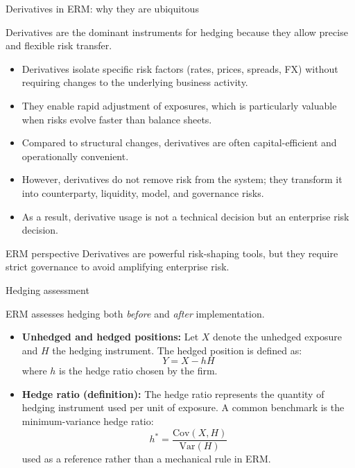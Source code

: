 \documentclass[aspectratio=169, 10pt]{beamer} %
\begin{document}
\begin{frame}{Derivatives in ERM: why they are ubiquitous}

Derivatives are the dominant instruments for hedging because they allow
precise and flexible risk transfer.

\medskip

\begin{itemize}
  \item[$\bullet$] Derivatives isolate specific risk factors (rates, prices,
  spreads, FX) without requiring changes to the underlying business activity.

  \item[$\bullet$] They enable rapid adjustment of exposures, which is
  particularly valuable when risks evolve faster than balance sheets.

  \item[$\bullet$] Compared to structural changes, derivatives are often
  capital-efficient and operationally convenient.
\end{itemize}

\begin{itemize}
  \item[$\bullet$] However, derivatives do not remove risk from the system;
  they transform it into counterparty, liquidity, model, and governance risks.

  \item[$\bullet$] As a result, derivative usage is not a technical decision
  but an enterprise risk decision.
\end{itemize}

\begin{block}{ERM perspective}
Derivatives are powerful risk-shaping tools, but they require strict governance
to avoid amplifying enterprise risk.
\end{block}

\end{frame}

\begin{frame}{Hedging assessment}

ERM assesses hedging both \emph{before} and \emph{after} implementation.

\medskip

\begin{itemize}
  \item[$\bullet$] \textbf{Unhedged and hedged positions:}
  Let $X$ denote the unhedged exposure and $H$ the hedging instrument.
  The hedged position is defined as:
  \[
  Y = X - hH
  \]
  where $h$ is the hedge ratio chosen by the firm.

  \item[$\bullet$] \textbf{Hedge ratio (definition):}
  The hedge ratio represents the quantity of hedging instrument used per unit
  of exposure. A common benchmark is the minimum-variance hedge ratio:
  \[
  h^* = \frac{\mathrm{Cov}(X,H)}{\mathrm{Var}(H)}
  \]
  used as a reference rather than a mechanical rule in ERM.
\end{itemize}

  \end{frame}
\end{document}
